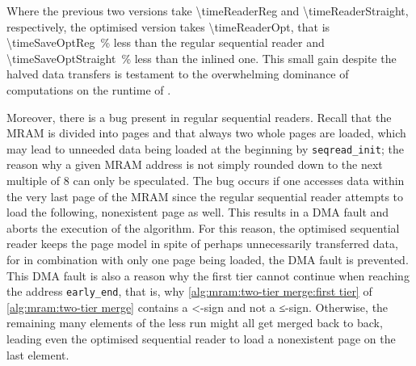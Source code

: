 Where the previous two versions take \qty[exponent-mode=fixed, fixed-exponent=9, round-mode=places, round-precision=2]{\timeReaderReg}{\cycle} and \qty[exponent-mode=fixed, fixed-exponent=9, round-mode=places, round-precision=2]{\timeReaderStraight}{\cycle}, respectively, the optimised version takes \qty[exponent-mode=fixed, fixed-exponent=9, round-mode=places, round-precision=2]{\timeReaderOpt}{\cycle}, that is \qty[round-mode=places, round-precision=0]{\timeSaveOptReg}{\percent} less than the regular sequential reader and \qty[round-mode=places, round-precision=0]{\timeSaveOptStraight}{\percent} less than the inlined one.
This small gain despite the halved data transfers is testament to the overwhelming dominance of computations on the runtime of \MS{}.

Moreover, there is a bug present in regular sequential readers.
Recall that the MRAM is divided into pages and that always two whole pages are loaded, which may lead to unneeded data being loaded at the beginning by \lstinline|seqread_init|;
the reason why a given MRAM address is not simply rounded down to the next multiple of 8 can only be speculated.
The bug occurs if one accesses data within the very last page of the MRAM since the regular sequential reader attempts to load the following, nonexistent page as well.
This results in a DMA fault and aborts the execution of the algorithm.
For this reason, the optimised sequential reader keeps the page model in spite of perhaps unnecessarily transferred data, for in combination with only one page being loaded, the DMA fault is prevented.
This DMA fault is also a reason why the first tier cannot continue when reaching the address \lstinline|early_end|, that is, why \cref{alg:mram:two-tier merge:first tier} of \cref{alg:mram:two-tier merge} contains a <-sign and not a ≤-sign.
Otherwise, the remaining \unrollfactor{} many elements of the less run might all get merged back to back, leading even the optimised sequential reader to load a nonexistent page on the last element.
